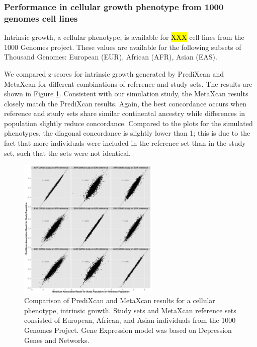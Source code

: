 \documentclass[10pt]{article}
\begin{document}
\subsubsection*{Performance in cellular growth phenotype from 1000 genomes cell lines}

Intrinsic growth, a cellular phenotype, is available for \hl{XXX} cell lines from the 1000 Genomes project. These values are available for the following subsets of Thousand Genomes: European (EUR), African (AFR), Asian (EAS). 

% 
%
%
%

We compared z-scores for  intrinsic growth generated by PrediXcan and MetaXcan for different combinations of reference and study sets. The results are shown in Figure \ref{fig:igrowthgrid}. Consistent with our simulation study, the MetaXcan results closely match the PrediXcan results. Again, the best concordance occurs when reference and study sets share similar continental ancestry while differences in population slightly reduce concordance. Compared to the plots for the simulated phenotypes, the diagonal concordance is slightly lower than 1; this is due to the fact that more individuals were included in the reference set than in the study set, such that the sets were not identical.

\begin{figure}
\includegraphics[width=0.6\textwidth]{plots/Fig4-igrowth_grid.png}
\caption{Comparison of PrediXcan and MetaXcan results for a cellular phenotype, intrinsic growth. 
Study sets and MetaXcan reference sets consisted of European, African, and Asian
individuals from the 1000 Genomes Project. Gene Expression model was based on Depression Genes and Networks.}
\label{fig:igrowthgrid}
\end{figure}
\end{document}
